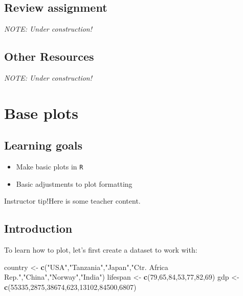 \documentclass[
]{book}
\newenvironment{Shaded}{\begin{snugshade}}{\end{snugshade}}
\newcommand{\DecValTok}[1]{\textcolor[rgb]{0.00,0.00,0.81}{#1}}
\newcommand{\KeywordTok}[1]{\textcolor[rgb]{0.13,0.29,0.53}{\textbf{#1}}}
\newcommand{\NormalTok}[1]{#1}
\newcommand{\StringTok}[1]{\textcolor[rgb]{0.31,0.60,0.02}{#1}}
\providecommand{\tightlist}{%
  \setlength{\itemsep}{0pt}\setlength{\parskip}{0pt}}
\begin{document}
\hypertarget{review-assignment-4}{%
\section*{Review assignment}\label{review-assignment-4}}

\emph{NOTE: Under construction!}

\hypertarget{other-resources-4}{%
\section*{Other Resources}\label{other-resources-4}}

\emph{NOTE: Under construction!}

\hypertarget{base-plots}{%
\chapter{Base plots}\label{base-plots}}

\hypertarget{learning-goals-5}{%
\section*{Learning goals}\label{learning-goals-5}}

\begin{itemize}
\tightlist
\item
  Make basic plots in \texttt{R}
\item
  Basic adjustments to plot formatting
\end{itemize}

Instructor tip!Here is some teacher content.

\hypertarget{introduction}{%
\section*{Introduction}\label{introduction}}

To learn how to plot, let's first create a dataset to work with:

\begin{Shaded}
\begin{Highlighting}[]
\NormalTok{country <-}\StringTok{ }\KeywordTok{c}\NormalTok{(}\StringTok{"USA"}\NormalTok{,}\StringTok{"Tanzania"}\NormalTok{,}\StringTok{"Japan"}\NormalTok{,}\StringTok{"Ctr. Africa Rep."}\NormalTok{,}\StringTok{"China"}\NormalTok{,}\StringTok{"Norway"}\NormalTok{,}\StringTok{"India"}\NormalTok{)}
\NormalTok{lifespan <-}\StringTok{ }\KeywordTok{c}\NormalTok{(}\DecValTok{79}\NormalTok{,}\DecValTok{65}\NormalTok{,}\DecValTok{84}\NormalTok{,}\DecValTok{53}\NormalTok{,}\DecValTok{77}\NormalTok{,}\DecValTok{82}\NormalTok{,}\DecValTok{69}\NormalTok{)}
\NormalTok{gdp <-}\StringTok{ }\KeywordTok{c}\NormalTok{(}\DecValTok{55335}\NormalTok{,}\DecValTok{2875}\NormalTok{,}\DecValTok{38674}\NormalTok{,}\DecValTok{623}\NormalTok{,}\DecValTok{13102}\NormalTok{,}\DecValTok{84500}\NormalTok{,}\DecValTok{6807}\NormalTok{)}
\end{Highlighting}
\end{Shaded}
\end{document}

